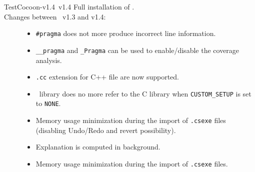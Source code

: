 \begin{TestCocoonDownload}
\begin{TestCocoonDownloadLink}
\end{TestCocoonDownloadLink}
\begin{ReleaseNote}{TestCocoon-v1.4}{\TestCocoon\ v1.4}
Full installation of \TestCocoon.\\
Changes between \TestCocoon\ v1.3 and v1.4:
\begin{description}
\item[\CoverageScanner]
  \begin{itemize}
    \item \BugFix \verb$#pragma$ does not more produce incorrect line information.
    \item \NewFeature \verb$__pragma$ and \verb$_Pragma$ can be used to enable/disable the coverage analysis.
    \item \BugFix \verb$.cc$ extension for C++ file are now supported.
    \item \NewFeature \CoverageScanner\ library does no more refer to the C library when \verb$CUSTOM_SETUP$ is set to \verb$NONE$.
  \end{itemize}
\item[\CoverageBrowser]
  \begin{itemize}
    \item \NewFeature Memory usage minimization during the import of \verb$.csexe$ files (disabling Undo/Redo and revert possibility).
    \item \NewFeature Explanation is computed in background.
  \end{itemize}
\item[\cmcsexeimport]
  \begin{itemize}
    \item \NewFeature Memory usage minimization during the import of \verb$.csexe$ files.
  \end{itemize}

\end{description}
\end{ReleaseNote}
\end{TestCocoonDownload}

